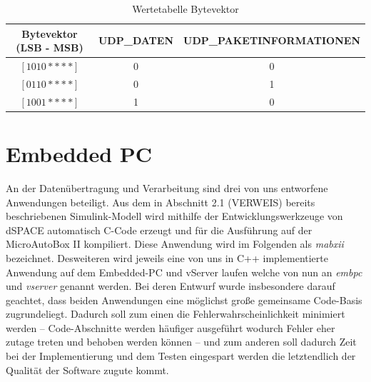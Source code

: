 \documentclass[fontsize = 12pt, paper = a4]{scrreprt}
\begin{document}
\begin{table}[h]
\centering

\caption{Wertetabelle Bytevektor}

 \begin{tabular}{ c | c | c }
 
 \toprule[1.5pt]
 Bytevektor (LSB - MSB) & UDP\_DATEN   &  UDP\_PAKETINFORMATIONEN  \\
 \midrule
  $[1 0 1 0 * * * *]$ & 0 & 0     \\
\midrule  
  $[0 1 1 0 * * * *]$ & 0 & 1     \\
\midrule  
  $[1 0 0 1 * * * *]$ & 1 & 0     \\

 
 \bottomrule[1.5pt] 
 
\end{tabular}

\end{table}

\newpage

    

   


 









  
 



   


\section{Embedded PC}

An der Datenübertragung und Verarbeitung sind drei von uns entworfene Anwendungen beteiligt. Aus dem in Abschnitt 2.1 (VERWEIS) bereits beschriebenen Simulink-Modell wird mithilfe der Entwicklungswerkzeuge von dSPACE automatisch C-Code erzeugt und für die Ausführung auf der MicroAutoBox II kompiliert. Diese Anwendung wird im Folgenden als \textit{mabxii} bezeichnet. Desweiteren wird jeweils eine von uns in C++ implementierte Anwendung auf dem Embedded-PC und vServer laufen welche von nun an \textit{embpc} und \textit{vserver} genannt werden. Bei deren Entwurf wurde insbesondere darauf geachtet, dass beiden Anwendungen eine möglichst große gemeinsame Code-Basis zugrundeliegt. Dadurch soll zum einen die Fehlerwahrscheinlichkeit minimiert werden -- Code-Abschnitte werden häufiger ausgeführt wodurch Fehler eher zutage treten und behoben werden können -- und zum anderen soll dadurch Zeit bei der Implementierung und dem Testen eingespart werden die letztendlich der Qualität der Software zugute kommt. 
\end{document}
